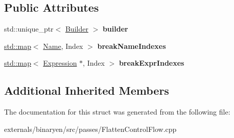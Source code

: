 \subsection*{Public Attributes}
\begin{DoxyCompactItemize}
\item 
\mbox{\label{structwasm_1_1_flatten_control_flow_a4ceea562818a50dd6a75ec1e559acb36}} 
std\+::unique\+\_\+ptr$<$ \mbox{\hyperlink{classwasm_1_1_builder}{Builder}} $>$ {\bfseries builder}
\item 
\mbox{\label{structwasm_1_1_flatten_control_flow_a5df16a56a3370ffe4334c3fcab7c227e}} 
\mbox{\hyperlink{classstd_1_1map}{std\+::map}}$<$ \mbox{\hyperlink{structwasm_1_1_name}{Name}}, Index $>$ {\bfseries break\+Name\+Indexes}
\item 
\mbox{\label{structwasm_1_1_flatten_control_flow_a6eb64a20b387dd8c5f11bd5706890061}} 
\mbox{\hyperlink{classstd_1_1map}{std\+::map}}$<$ \mbox{\hyperlink{classwasm_1_1_expression}{Expression}} $\ast$, Index $>$ {\bfseries break\+Expr\+Indexes}
\end{DoxyCompactItemize}
\subsection*{Additional Inherited Members}


The documentation for this struct was generated from the following file\+:\begin{DoxyCompactItemize}
\item 
externals/binaryen/src/passes/Flatten\+Control\+Flow.\+cpp\end{DoxyCompactItemize}
